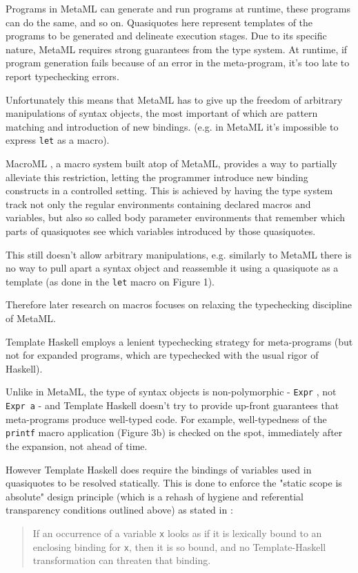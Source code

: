 \documentclass[10pt,journal,a4paper]{IEEEtran}
\begin{document}
Programs in MetaML can generate and run programs at runtime, these programs can do the same, and so on.
Quasiquotes here represent templates of the programs to be generated and delineate execution stages.
Due to its specific nature, MetaML requires strong guarantees from the type system.
At runtime, if program generation fails because of an error in the meta-program,
it's too late to report typechecking errors.

Unfortunately this means that MetaML has to give up the freedom of arbitrary manipulations
of syntax objects, the most important of which are pattern matching and introduction of new bindings.
(e.g. in MetaML it’s impossible to express \small \texttt{let} \normalsize as a macro).

MacroML \cite{ganz01}, a macro system built atop of MetaML,
provides a way to partially alleviate this restriction, letting
the programmer introduce new binding constructs in a controlled setting.
This is achieved by having the type system track
not only the regular environments containing declared macros and variables, but also
so called body parameter environments that remember which parts of quasiquotes
see which variables introduced by those quasiquotes.

This still doesn't allow arbitrary manipulations, e.g. similarly to MetaML there is no way
to pull apart a syntax object and reassemble it using a quasiquote as a template
(as done in the \small \texttt{let} \normalsize macro on Figure 1).

Therefore later research on macros focuses on relaxing the typechecking discipline of MetaML.

Template Haskell \cite{sheard02} employs a lenient typechecking strategy for meta-programs
(but not for expanded programs, which are typechecked with the usual rigor of Haskell).

Unlike in MetaML, the type of syntax objects is non-polymorphic - \small \texttt{Expr} \normalsize,
not \small \texttt{Expr a} \normalsize - and Template Haskell doesn't try to provide up-front
guarantees that meta-programs produce well-typed code. For example, well-typedness of the
\small \texttt{printf} \normalsize macro application (Figure 3b) is checked on the spot,
immediately after the expansion, not ahead of time.

However Template Haskell does require the bindings of variables used in quasiquotes to be resolved statically.
This is done to enforce the "static scope is absolute" design principle
(which is a rehash of hygiene and referential transparency conditions outlined above)
as stated in \cite{sheard03}:
\begin{quote}
If an occurrence of a variable \small \texttt{x} \normalsize looks as if it is lexically bound
to an enclosing binding for \small \texttt{x}\normalsize,
then it is so bound, and no Template-Haskell transformation can threaten that binding.
\end{quote}
\end{document}
